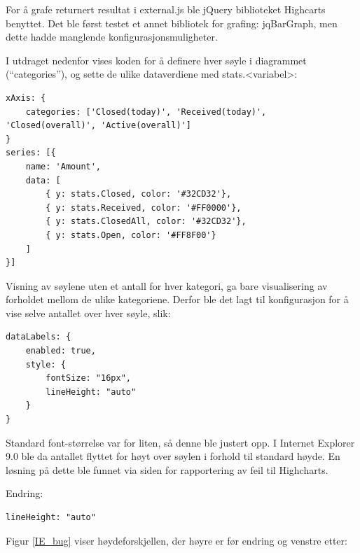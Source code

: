 For å grafe returnert resultat i external.js ble jQuery biblioteket Highcarts benyttet. Det ble først testet et annet bibliotek for grafing: jqBarGraph, men dette hadde manglende konfigurasjonsmuligheter.  

I utdraget nedenfor vises koden for å definere hver søyle i diagrammet (``categories''), og sette de ulike dataverdiene med stats.<variabel>:
\begin{lstlisting}[style=example]
xAxis: {
    categories: ['Closed(today)', 'Received(today)', 'Closed(overall)', 'Active(overall)']
}
series: [{
    name: 'Amount',
    data: [
        { y: stats.Closed, color: '#32CD32'},
        { y: stats.Received, color: '#FF0000'},
        { y: stats.ClosedAll, color: '#32CD32'},
        { y: stats.Open, color: '#FF8F00'}
    ]
}]
\end{lstlisting}

Visning av søylene uten et antall for hver kategori, ga bare visualisering av forholdet mellom de ulike kategoriene. Derfor ble det lagt til konfigurasjon for å vise selve antallet over hver søyle, slik: 

\begin{lstlisting}
dataLabels: {
    enabled: true,
    style: {
        fontSize: "16px",
        lineHeight: "auto"
    }
}
\end{lstlisting}

Standard font-størrelse var for liten, så denne ble justert opp. I Internet Explorer 9.0 ble da antallet flyttet for høyt over søylen i forhold til standard høyde. En løsning på dette ble funnet via siden for rapportering av feil til Highcharts\cite{iebug}. 

Endring:

\begin{lstlisting}[style=example]
lineHeight: "auto"
\end{lstlisting}

Figur \ref{IE_bug} viser høydeforskjellen, der høyre er før endring og venstre etter:


